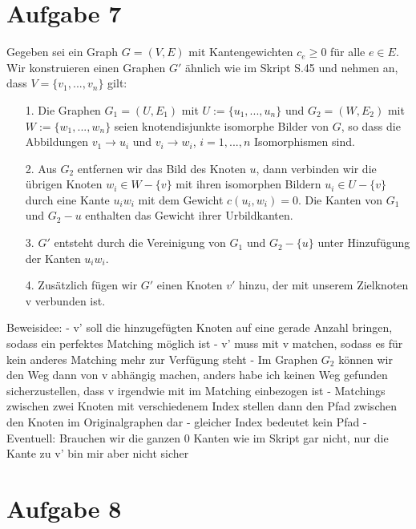 \documentclass[a4paper,10pt,german]{scrartcl}
\begin{document}
\section*{Aufgabe 7}
Gegeben sei ein Graph $G = (V,E)$ mit Kantengewichten $c_e \ge 0$ für alle $e \in E$. Wir konstruieren einen Graphen $G'$ ähnlich wie im Skript S.45 und nehmen an, dass $V = \{v_1,...,v_n\}$ gilt:
\begin{enumerate}
	\item[1.] Die Graphen $G_1 = (U,E_1)$ mit $U := \{u_1,...,u_n\}$ und $G_2 = (W,E_2)$ mit $W := \{w_1,...,w_n\}$ seien knotendisjunkte isomorphe Bilder von $G$, so dass die Abbildungen $v_1 \rightarrow u_i $ und $v_i \rightarrow w_i$, $i = 1,...,n$ Isomorphismen sind.
	\item[2.] Aus $G_2$ entfernen wir das Bild des Knoten $u$, dann verbinden wir die übrigen Knoten $w_i \in W - \{v\}$ mit ihren isomorphen  Bildern $u_i \in U - \{v\}$ durch eine Kante $u_iw_i$ mit dem Gewicht $c(u_i,w_i)=0$. Die Kanten von $G_1$ und $G_2 - {u}$ enthalten das Gewicht ihrer Urbildkanten.
	\item[3.] $G'$ entsteht durch die Vereinigung von $G_1$ und $G_2 - \{u\}$ unter Hinzufügung der Kanten $u_iw_i$.
	\item[4.] Zusätzlich fügen wir $G'$ einen Knoten $v'$ hinzu, der mit unserem Zielknoten v verbunden ist.  
\end{enumerate}

Beweisidee:
- v' soll die hinzugefügten Knoten auf eine gerade Anzahl bringen, sodass ein perfektes Matching möglich ist
- v' muss mit v matchen, sodass es für kein anderes Matching mehr zur Verfügung steht
- Im Graphen $G_2$ können wir den Weg dann von v abhängig machen, anders habe ich keinen Weg gefunden sicherzustellen, dass v irgendwie mit im Matching einbezogen ist
- Matchings zwischen zwei Knoten mit verschiedenem Index stellen dann den Pfad zwischen den Knoten im Originalgraphen dar
- gleicher Index bedeutet kein Pfad
- Eventuell: Brauchen wir die ganzen 0 Kanten wie im Skript gar nicht, nur die Kante zu v' bin mir aber nicht sicher


\section*{Aufgabe 8}
\end{document}
